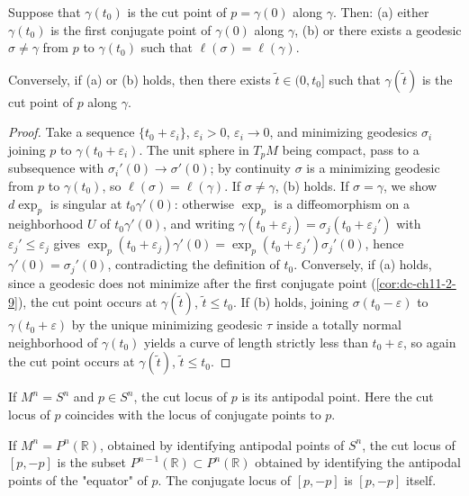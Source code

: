 \begin{proposition}
  \label{prop:dc-ch13-2-2}
  Suppose that $\gamma(t_0)$ is the cut point of $p=\gamma(0)$ along $\gamma$. Then:
  (a) either $\gamma(t_0)$ is the first conjugate point of $\gamma(0)$ along
    $\gamma$,
  (b) or there exists a geodesic $\sigma\neq\gamma$ from $p$ to $\gamma(t_0)$ such
    that $\ell(\sigma)=\ell(\gamma)$.
  
  Conversely, if (a) or (b) holds, then there exists $\tilde t\in(0,t_0]$ such that
  $\gamma(\tilde t)$ is the cut point of $p$ along $\gamma$.
\end{proposition}
\begin{proof}
\sketch
  Take a sequence $\{t_0+\varepsilon_i\}$, $\varepsilon_i>0$,
  $\varepsilon_i\to 0$, and minimizing geodesics $\sigma_i$ joining $p$ to
  $\gamma(t_0+\varepsilon_i)$. The unit sphere in $T_pM$ being compact, pass to a
  subsequence with $\sigma_i'(0)\to\sigma'(0)$; by continuity $\sigma$ is a
  minimizing geodesic from $p$ to $\gamma(t_0)$, so $\ell(\sigma)=\ell(\gamma)$. If
  $\sigma\neq\gamma$, (b) holds. If $\sigma=\gamma$, we show $d\exp_p$ is singular at
  $t_0\gamma'(0)$: otherwise $\exp_p$ is a diffeomorphism on a neighborhood $U$ of
  $t_0\gamma'(0)$, and writing $\gamma(t_0+\varepsilon_j)=\sigma_j(t_0+\varepsilon_j')$
  with $\varepsilon_j'\leq\varepsilon_j$ gives
  $\exp_p(t_0+\varepsilon_j)\gamma'(0)=\exp_p(t_0+\varepsilon_j')\sigma_j'(0)$, hence
  $\gamma'(0)=\sigma_j'(0)$, contradicting the definition of $t_0$. Conversely, if
  (a) holds, since a geodesic does not minimize after the first conjugate point
  (\cref{cor:dc-ch11-2-9}), the cut point occurs at
  $\gamma(\tilde t)$, $\tilde t\leq t_0$. If (b) holds, joining $\sigma(t_0-\varepsilon)$
  to $\gamma(t_0+\varepsilon)$ by the unique minimizing geodesic $\tau$ inside a
  totally normal neighborhood of $\gamma(t_0)$ yields a curve of length strictly less
  than $t_0+\varepsilon$, so again the cut point occurs at $\gamma(\tilde t)$,
  $\tilde t\leq t_0$.
\end{proof}

\begin{example}
  \label{ex:dc-ch13-2-3}
  If $M^n=S^n$ and $p\in S^n$, the cut locus of $p$ is its antipodal point. Here the
  cut locus of $p$ coincides with the locus of conjugate points to $p$.
\end{example}

\begin{example}
  \label{ex:dc-ch13-2-4}
  If $M^n=P^n(\mathbb{R})$, obtained by identifying antipodal points of $S^n$, the
  cut locus of $[p,-p]$ is the subset $P^{n-1}(\mathbb{R})\subset P^n(\mathbb{R})$
  obtained by identifying the antipodal points of the "equator" of $p$. The conjugate
  locus of $[p,-p]$ is $[p,-p]$ itself.
\end{example}

